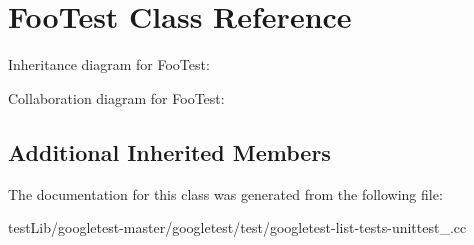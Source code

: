 \hypertarget{classFooTest}{}\section{Foo\+Test Class Reference}
\label{classFooTest}


Inheritance diagram for Foo\+Test\+:


Collaboration diagram for Foo\+Test\+:
\subsection*{Additional Inherited Members}


The documentation for this class was generated from the following file\+:\begin{DoxyCompactItemize}
\item 
test\+Lib/googletest-\/master/googletest/test/googletest-\/list-\/tests-\/unittest\+\_\+.\+cc\end{DoxyCompactItemize}
